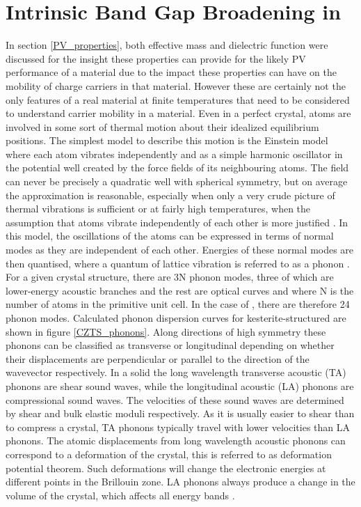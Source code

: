 \section{Intrinsic Band Gap Broadening in {\CZTS}}\label{Eg_broadening_proj}
In section \ref{PV_properties}, both effective mass and dielectric function were discussed for the insight these properties can provide for the likely PV performance of a material due to the impact these properties can have on the mobility of charge carriers in that material. However these are certainly not the only features of a real material at finite temperatures that need to be considered to understand carrier mobility in a material. 
Even in a perfect crystal, atoms are involved in some sort of thermal motion about their idealized equilibrium positions. The simplest model to describe this motion is the Einstein model where each atom vibrates independently and as a simple harmonic oscillator in the potential well created by the force fields of its neighbouring atoms. The field can never be precisely a quadratic well with spherical symmetry, but on average the approximation is reasonable, especially when only a very crude picture of thermal vibrations is sufficient or at fairly high temperatures, when the assumption that atoms vibrate independently of each other is more justified \cite{Ziman_solids}. In this model, the oscillations of the atoms can be expressed in terms of normal modes as they are independent of each other. Energies of these normal modes are then quantised, where a quantum of lattice vibration is referred to as a phonon \cite{fund_semi}.\\

For a given crystal structure, there are 3N phonon modes, three of which are lower-energy acoustic branches and the rest are optical curves and where N is the number of atoms in the primitive unit cell. In the case of {\CZTS}, there are therefore 24 phonon modes. Calculated phonon dispersion curves for kesterite-structured {\CZTS} are shown in figure \ref{CZTS_phonons}.
Along directions of high symmetry these phonons can be classified as transverse or longitudinal depending on whether their displacements are perpendicular or parallel to the direction of the wavevector respectively. In a solid the long wavelength transverse acoustic (TA) phonons are shear sound waves, while the longitudinal acoustic (LA) phonons are compressional sound waves. The velocities of these sound waves are determined by shear and bulk elastic moduli respectively. As it is usually easier to shear than to compress a crystal, TA phonons typically travel with lower velocities than LA phonons.  
The atomic displacements from long wavelength acoustic phonons can correspond to a deformation of the crystal, this is referred to as deformation potential theorem. Such deformations will change the electronic energies at different points in the Brillouin zone. LA phonons always produce a change in the volume of the crystal, which affects all energy bands \cite{fund_semi}.\\


